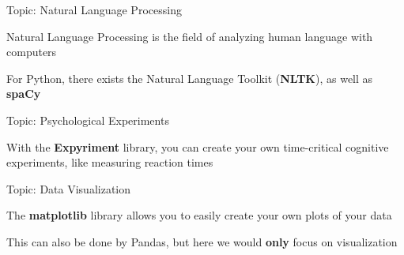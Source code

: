 \begin{frame}{Topic: Natural Language Processing}

    Natural Language Processing is the field of analyzing human language with computers

    \vspace{1em}

    For Python, there exists the Natural Language Toolkit (\textbf{NLTK}), as well as \textbf{spaCy}

\end{frame}

\begin{frame}{Topic: Psychological Experiments}

    With the \textbf{Expyriment} library, you can create your own time-critical cognitive experiments, like measuring reaction times

\end{frame}

\begin{frame}{Topic: Data Visualization}

    The \textbf{matplotlib} library allows you to easily create your own plots of your data

    \vspace{1em}

    This can also be done by Pandas, but here we would \textbf{only} focus on visualization

\end{frame}



